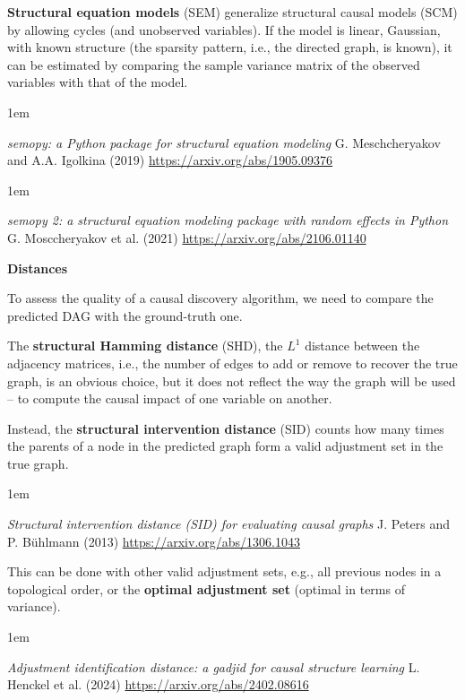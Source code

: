 \documentclass[a5paper]{article}
\let\d\textbf
\newenvironment{reference}{%
  \medskip\goodbreak
  \parskip 0pt
  \raggedright
  \leftskip 1em
  \obeylines
}{\par\medskip\goodbreak}
\def\subsection#1{{\par\bigskip\goodbreak\large\bfseries #1\par}}
\begin{document}
\d{Structural equation models} (SEM) generalize
structural causal models (SCM) by allowing cycles (and unobserved variables).
If the model is linear, Gaussian, with known structure
(the sparsity pattern, i.e., the directed graph, is known),
it can be estimated by comparing the sample variance matrix of the observed variables
with that of the model.

\begin{reference}
  \emph{semopy: a Python package for structural equation modeling}
  G. Meschcheryakov and A.A. Igolkina (2019)
  \url{https://arxiv.org/abs/1905.09376}
\end{reference}

\begin{reference}
  \emph{semopy 2: a structural equation modeling package with random effects in Python}
  G. Mosccheryakov et al. (2021)
  \url{https://arxiv.org/abs/2106.01140}
\end{reference}

\subsection{Distances}

To assess the quality of a causal discovery algorithm,
we need to compare the predicted DAG with the ground-truth one.

The \d{structural Hamming distance} (SHD), the $L^1$ distance between the adjacency matrices,
i.e., the number of edges to add or remove to recover the true graph,
is an obvious choice, but it does not reflect the way the graph will be used --
to compute the causal impact of one variable on another. 

Instead, the \d{structural intervention distance} (SID)
counts how many times the parents of a node in the predicted graph
form a valid adjustment set in the true graph.

\begin{reference}
  \emph{Structural intervention distance (SID) for evaluating causal graphs}
  J. Peters and P. Bühlmann (2013)
  \url{https://arxiv.org/abs/1306.1043}
\end{reference}

This can be done with other valid adjustment sets,
e.g., all previous nodes in a topological order,
or the \d{optimal adjustment set} (optimal in terms of variance).

\begin{reference}
  \emph{Adjustment identification distance: a gadjid for  causal structure learning}
  L. Henckel et al. (2024)
  \url{https://arxiv.org/abs/2402.08616}
\end{reference}
\end{document}
